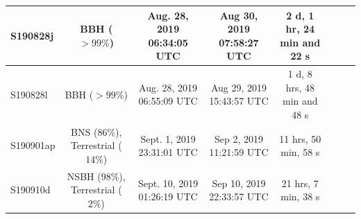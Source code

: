 \begin{table}
{\begin{tabular}{l*{6}{c}r}
\hline
S190828j & BBH ($>99\%$) & Aug. 28, 2019 06:34:05 UTC & 
Aug 30, 2019 07:58:27 UTC & 2 d, 1 hr, 24 min and 22 s \\
\hline
S190828l & BBH ($>99\%$) & Aug. 28, 2019 06:55:09 UTC & 
Aug 29, 2019 15:43:57 UTC & 1 d, 8 hrs, 48 min and 48 s \\
\hline
S190901ap & BNS ($86\%$), Terrestrial ($14\%$) & 
Sept. 1, 2019 23:31:01 UTC & Sep 2, 2019 11:21:59 UTC & 
11 hrs, 50 min, 58 s \\
\hline
S190910d & NSBH ($98\%$), Terrestrial ($2\%$) & Sept. 10, 2019 01:26:19 UTC & 
Sep 10, 2019 22:33:57 UTC & 21 hrs, 7 min, 38 s \\
\end{tabular} 
}
\end{table}

%
%
